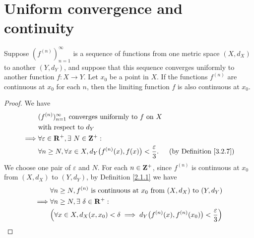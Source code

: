 \section{Uniform convergence and continuity}\label{sec 3.3}

\begin{theorem}\label{3.3.1}
    Suppose \((f^{(n)})_{n = 1}^\infty\) is a sequence of functions from one metric space \((X, d_X)\) to another \((Y, d_Y)\), and suppose that this sequence converges uniformly to another function \(f : X \to Y\).
    Let \(x_0\) be a point in \(X\).
    If the functions \(f^{(n)}\) are continuous at \(x_0\) for each \(n\), then the limiting function \(f\) is also continuous at \(x_0\).
\end{theorem}

\begin{proof}
    We have
    \begin{align*}
                 & (f^{(n)})_{n = 1}^\infty \text{ converges uniformly to } f \text{ on } X                                                       \\
                 & \text{with respect to } d_Y                                                                                                    \\
        \implies & \forall \varepsilon \in \mathbf{R}^+, \exists\ N \in \mathbf{Z}^+ :                                                                            \\
                 & \forall n \geq N, \forall x \in X, d_Y\big(f^{(n)}(x), f(x)\big) < \frac{\varepsilon}{3}. & \text{(by Definition \ref{3.2.7})}
    \end{align*}
    We choose one pair of \(\varepsilon\) and \(N\).
    For each \(n \in \mathbf{Z}^+\), since \(f^{(n)}\) is continuous at \(x_0\) from \((X, d_X)\) to \((Y, d_Y)\), by Definition \ref{2.1.1} we have
    \begin{align*}
                 & \forall n \geq N, f^{(n)} \text{ is continuous at } x_0 \text{ from } (X, d_X) \text{ to } (Y, d_Y)                                                                                         \\
        \implies & \forall n \geq N, \exists\ \delta \in \R^+ :                                                                                                                                                \\
                 & \Big(\forall x \in X, d_X(x, x_0) < \delta \implies d_Y\big(f^{(n)}(x), f^{(n)}(x_0)\big) < \frac{\varepsilon}{3}\Big)                                                                      \\

\end{align*}
\end{proof}
